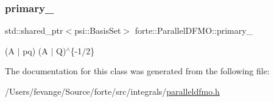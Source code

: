 \mbox{\label{classforte_1_1_parallel_d_f_m_o_ae125d481accd93974e190846f7397e79}} 
\subsubsection{\texorpdfstring{primary\+\_\+}{primary\_}}
{\footnotesize\ttfamily std\+::shared\+\_\+ptr$<$psi\+::\+Basis\+Set$>$ forte\+::\+Parallel\+D\+F\+M\+O\+::primary\+\_\+\hspace{0.3cm}{\ttfamily [protected]}}



(A $\vert$ pq) (A $\vert$ Q)$^\wedge$\{-\/1/2\} 



The documentation for this class was generated from the following file\+:\begin{DoxyCompactItemize}
\item 
/\+Users/fevange/\+Source/forte/src/integrals/\mbox{\hyperlink{paralleldfmo_8h}{paralleldfmo.\+h}}\end{DoxyCompactItemize}
